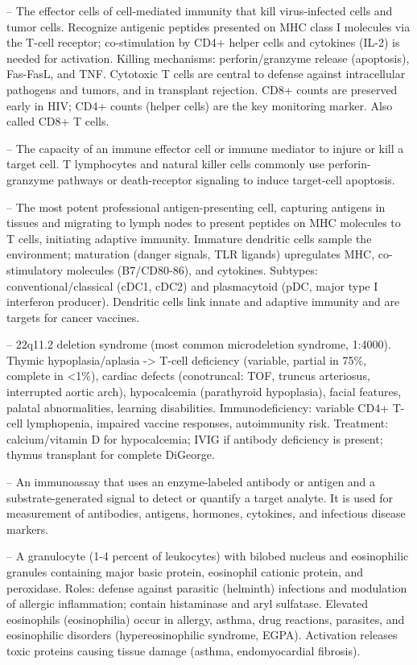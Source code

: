 -- The effector cells of cell-mediated immunity that kill virus-infected cells and tumor cells. Recognize antigenic peptides presented on MHC class I molecules via the T-cell receptor; co-stimulation by CD4+ helper cells and cytokines (IL-2) is needed for activation. Killing mechanisms: perforin/granzyme release (apoptosis), Fas-FasL, and TNF. Cytotoxic T cells are central to defense against intracellular pathogens and tumors, and in transplant rejection. CD8+ counts are preserved early in HIV; CD4+ counts (helper cells) are the key monitoring marker. Also called CD8+ T cells.

-- The capacity of an immune effector cell or immune mediator to injure or kill a target cell. T lymphocytes and natural killer cells commonly use perforin-granzyme pathways or death-receptor signaling to induce target-cell apoptosis.

-- The most potent professional antigen-presenting cell, capturing antigens in tissues and migrating to lymph nodes to present peptides on MHC molecules to T cells, initiating adaptive immunity. Immature dendritic cells sample the environment; maturation (danger signals, TLR ligands) upregulates MHC, co-stimulatory molecules (B7/CD80-86), and cytokines. Subtypes: conventional/classical (cDC1, cDC2) and plasmacytoid (pDC, major type I interferon producer). Dendritic cells link innate and adaptive immunity and are targets for cancer vaccines.

-- 22q11.2 deletion syndrome (most common microdeletion syndrome, 1:4000). Thymic hypoplasia/aplasia -> T-cell deficiency (variable, partial in 75\%, complete in <1\%), cardiac defects (conotruncal: TOF, truncus arteriosus, interrupted aortic arch), hypocalcemia (parathyroid hypoplasia), facial features, palatal abnormalities, learning disabilities. Immunodeficiency: variable CD4+ T-cell lymphopenia, impaired vaccine responses, autoimmunity risk. Treatment: calcium/vitamin D for hypocalcemia; IVIG if antibody deficiency is present; thymus transplant for complete DiGeorge.

-- An immunoassay that uses an enzyme-labeled antibody or antigen and a substrate-generated signal to detect or quantify a target analyte. It is used for measurement of antibodies, antigens, hormones, cytokines, and infectious disease markers.

-- A granulocyte (1-4 percent of leukocytes) with bilobed nucleus and eosinophilic granules containing major basic protein, eosinophil cationic protein, and peroxidase. Roles: defense against parasitic (helminth) infections and modulation of allergic inflammation; contain histaminase and aryl sulfatase. Elevated eosinophils (eosinophilia) occur in allergy, asthma, drug reactions, parasites, and eosinophilic disorders (hypereosinophilic syndrome, EGPA). Activation releases toxic proteins causing tissue damage (asthma, endomyocardial fibrosis).


